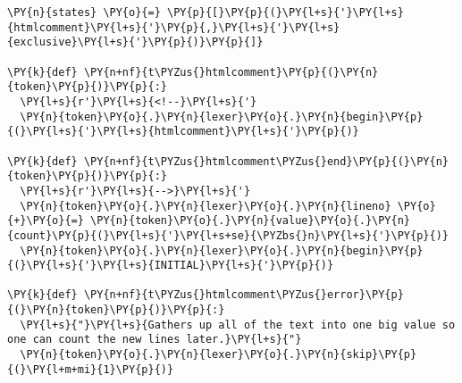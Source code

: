 \begin{Verbatim}[commandchars=\\\{\}]
\PY{n}{states} \PY{o}{=} \PY{p}{[}\PY{p}{(}\PY{l+s}{'}\PY{l+s}{htmlcomment}\PY{l+s}{'}\PY{p}{,}\PY{l+s}{'}\PY{l+s}{exclusive}\PY{l+s}{'}\PY{p}{)}\PY{p}{]}

\PY{k}{def} \PY{n+nf}{t\PYZus{}htmlcomment}\PY{p}{(}\PY{n}{token}\PY{p}{)}\PY{p}{:}
  \PY{l+s}{r'}\PY{l+s}{<!--}\PY{l+s}{'}
  \PY{n}{token}\PY{o}{.}\PY{n}{lexer}\PY{o}{.}\PY{n}{begin}\PY{p}{(}\PY{l+s}{'}\PY{l+s}{htmlcomment}\PY{l+s}{'}\PY{p}{)}

\PY{k}{def} \PY{n+nf}{t\PYZus{}htmlcomment\PYZus{}end}\PY{p}{(}\PY{n}{token}\PY{p}{)}\PY{p}{:}
  \PY{l+s}{r'}\PY{l+s}{-->}\PY{l+s}{'}
  \PY{n}{token}\PY{o}{.}\PY{n}{lexer}\PY{o}{.}\PY{n}{lineno} \PY{o}{+}\PY{o}{=} \PY{n}{token}\PY{o}{.}\PY{n}{value}\PY{o}{.}\PY{n}{count}\PY{p}{(}\PY{l+s}{'}\PY{l+s+se}{\PYZbs{}n}\PY{l+s}{'}\PY{p}{)}
  \PY{n}{token}\PY{o}{.}\PY{n}{lexer}\PY{o}{.}\PY{n}{begin}\PY{p}{(}\PY{l+s}{'}\PY{l+s}{INITIAL}\PY{l+s}{'}\PY{p}{)}

\PY{k}{def} \PY{n+nf}{t\PYZus{}htmlcomment\PYZus{}error}\PY{p}{(}\PY{n}{token}\PY{p}{)}\PY{p}{:}
  \PY{l+s}{"}\PY{l+s}{Gathers up all of the text into one big value so one can count the new lines later.}\PY{l+s}{"}
  \PY{n}{token}\PY{o}{.}\PY{n}{lexer}\PY{o}{.}\PY{n}{skip}\PY{p}{(}\PY{l+m+mi}{1}\PY{p}{)} 
\end{Verbatim}
